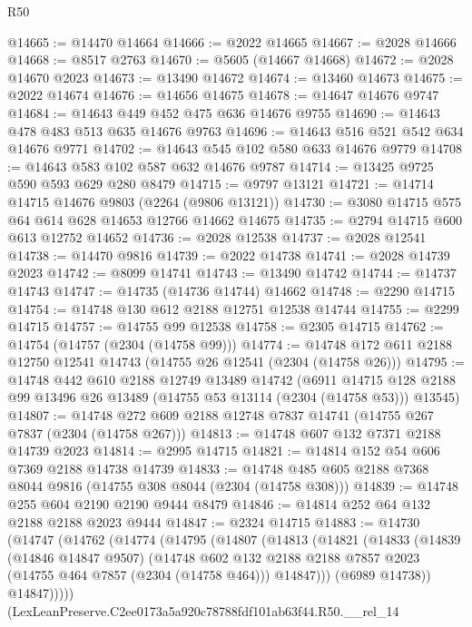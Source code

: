 \begin{lexlean}{R50}
\begin{coremodule}
@14665 := @14470 @14664
@14666 := @2022 @14665
@14667 := @2028 @14666
@14668 := @8517 @2763
@14670 := @5605 (@14667 @14668)
@14672 := @2028 @14670 @2023
@14673 := @13490 @14672
@14674 := @13460 @14673
@14675 := @2022 @14674
@14676 := @14656 @14675
@14678 := @14647 @14676 @9747
@14684 := @14643 @449 @452 @475 @636 @14676 @9755
@14690 := @14643 @478 @483 @513 @635 @14676 @9763
@14696 := @14643 @516 @521 @542 @634 @14676 @9771
@14702 := @14643 @545 @102 @580 @633 @14676 @9779
@14708 := @14643 @583 @102 @587 @632 @14676 @9787
@14714 := @13425 @9725 @590 @593 @629 @280 @8479
@14715 := @9797 @13121
@14721 := @14714 @14715 @14676 @9803 (@2264 (@9806 @13121))
@14730 := @3080 @14715 @575 @64 @614 @628 @14653 @12766 @14662 @14675
@14735 := @2794 @14715 @600 @613 @12752 @14652
@14736 := @2028 @12538
@14737 := @2028 @12541
@14738 := @14470 @9816
@14739 := @2022 @14738
@14741 := @2028 @14739 @2023
@14742 := @8099 @14741
@14743 := @13490 @14742
@14744 := @14737 @14743
@14747 := @14735 (@14736 @14744) @14662
@14748 := @2290 @14715
@14754 := @14748 @130 @612 @2188 @12751 @12538 @14744
@14755 := @2299 @14715
@14757 := @14755 @99 @12538
@14758 := @2305 @14715
@14762 := @14754 (@14757 (@2304 (@14758 @99)))
@14774 := @14748 @172 @611 @2188 @12750 @12541 @14743 (@14755 @26 @12541 (@2304 (@14758 @26)))
@14795 := @14748
    @442
    @610
    @2188
    @12749
    @13489
    @14742
    (@6911 @14715 @128 @2188 @99 @13496 @26 @13489 (@14755 @53 @13114 (@2304 (@14758 @53))) @13545)
@14807 := @14748 @272 @609 @2188 @12748 @7837 @14741 (@14755 @267 @7837 (@2304 (@14758 @267)))
@14813 := @14748 @607 @132 @7371 @2188 @14739 @2023
@14814 := @2995 @14715
@14821 := @14814 @152 @54 @606 @7369 @2188 @14738 @14739
@14833 := @14748 @485 @605 @2188 @7368 @8044 @9816 (@14755 @308 @8044 (@2304 (@14758 @308)))
@14839 := @14748 @255 @604 @2190 @2190 @9444 @8479
@14846 := @14814 @252 @64 @132 @2188 @2188 @2023 @9444
@14847 := @2324 @14715
@14883 := @14730
    (@14747
      (@14762
        (@14774
          (@14795
            (@14807
              (@14813
                (@14821
                  (@14833
                    (@14839
                      (@14846 @14847 @9507)
                      (@14748
                        @602
                        @132
                        @2188
                        @2188
                        @7857
                        @2023
                        (@14755 @464 @7857 (@2304 (@14758 @464)))
                        @14847)))
                  (@6989 @14738))
                @14847)))))
      (LexLeanPreserve.C2ee0173a5a920c78788fdf101ab63f44.R50.__rel_14

\end{coremodule}
\end{lexlean}

